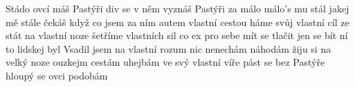 \begin{TEXT}{Stádo}
\REFREN  {}  ovcí máš \NL
Pastýři  div  se v něm vyznáš \NL
Pastýři za málo  málo's mu stál \NL
jakej   mě stále čekáš \NL
když  co jsem za 
\SLOKA {}ním autem vlastní cestou \NL
{}háme svůj vlastní cíl \NL
{}ze stát na vlastní noze \NL
{}šetříme vlastních sil \NL
{}co ex pro sebe mít \NL
{} se tlačit jen se bít \NL
{}ní to lidskej  byl 
\SLOKA Vsadil jsem na vlastní rozum \NL
nic nenechám náhodám \NL
žiju si na velký noze \NL
ouzkejm cestám uhejbám \NL
ve svý vlastní víře \NL
pást se bez Pastýře \NL
hloupý se ovci podobám
\end{TEXT}
